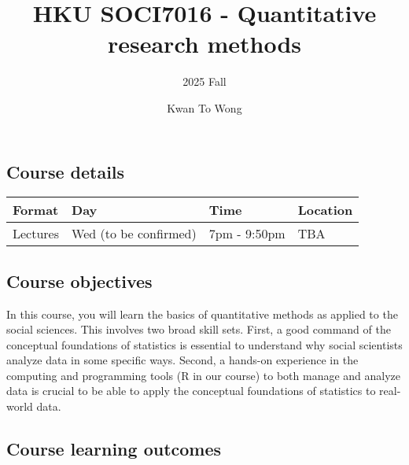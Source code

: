 \documentclass[
  letterpaper,
  DIV=11,
  numbers=noendperiod]{scrartcl}
\title{HKU SOCI7016 - Quantitative research methods}
\subtitle{2025 Fall}
\author{Kwan To Wong}
\date{}
\begin{document}
\maketitle


\subsection{Course details}\label{course-details}

\begin{longtable}[]{@{}
  >{\raggedright\arraybackslash}p{}
  >{\raggedright\arraybackslash}p{}
  >{\raggedright\arraybackslash}p{}
  >{\raggedright\arraybackslash}p{}@{}}
\toprule\noalign{}
\begin{minipage}[b]{\linewidth}\raggedright
Format
\end{minipage} & \begin{minipage}[b]{\linewidth}\raggedright
Day
\end{minipage} & \begin{minipage}[b]{\linewidth}\raggedright
Time
\end{minipage} & \begin{minipage}[b]{\linewidth}\raggedright
Location
\end{minipage} \\
\midrule\noalign{}
\endhead
\bottomrule\noalign{}
\endlastfoot
Lectures & Wed (to be confirmed) & 7pm - 9:50pm & TBA \\
\end{longtable}

\subsection{Course objectives}\label{course-objectives}

In this course, you will learn the basics of quantitative methods as
applied to the social sciences. This involves two broad skill sets.
First, a good command of the conceptual foundations of statistics is
essential to understand why social scientists analyze data in some
specific ways. Second, a hands-on experience in the computing and
programming tools (R in our course) to both manage and analyze data is
crucial to be able to apply the conceptual foundations of statistics to
real-world data.

\subsection{Course learning outcomes}\label{course-learning-outcomes}
\end{document}
